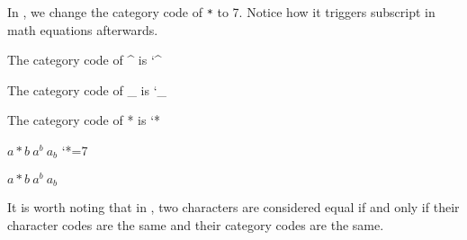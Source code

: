 \documentclass{ltugboat}
\begin{document}
In , we change the category code of \verb|*| to 7.
Notice how it triggers subscript in math equations afterwards.
\begin{latexsample}[examplelabel={ex:category-code},exampletitle={Category Code}]
\par The category code of \^{} is \the\catcode`^
\par The category code of \_{} is \the\catcode`_
\par The category code of * is \the\catcode`*
\par $a*b~a^b~a_b$
\catcode`*=7
\par $a*b~a^b~a_b$
\end{latexsample}
\noindent 
It is worth noting that in \LT{}, two characters are considered equal if and only if their character codes are the same and their category codes are the same.
\end{document}
